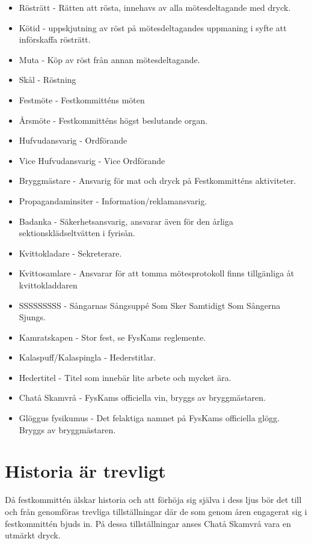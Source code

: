 \documentclass{dgovdoc}
\begin{document}
\begin{itemize}
\item Rösträtt - Rätten att rösta, innehavs av alla mötesdeltagande med dryck.
\item Kötid - uppskjutning av röst på mötesdeltagandes uppmaning i syfte att    införskaffa rösträtt.
\item Muta -  Köp av röst från annan mötesdeltagande.
\item Skål - Röstning
\item Festmöte - Festkommitténs möten
\item Årsmöte - Festkommitténs högst beslutande organ.
\item Hufvudansvarig - Ordförande
\item Vice Hufvudansvarig - Vice Ordförande
\item Bryggmästare - Ansvarig för mat och dryck på Festkommitténs aktiviteter.
\item Propagandaminsiter - Information/reklamansvarig.
\item Badanka - Säkerhetsansvarig, ansvarar även för den årliga sektionsklädseltvätten i fyrisån.
\item Kvittokladare - Sekreterare.
\item Kvittosamlare - Ansvarar för att tomma mötesprotokoll finns tillgänliga åt kvittokladdaren
\item SSSSSSSSS - Sångarnas Sångsuppé Som Sker Samtidigt Som Sångerna Sjungs.
\item Kamratskapen - Stor fest, se FysKams reglemente.
\item Kalaspuff/Kalaspingla - Hederstitlar.
\item Hedertitel - Titel som innebär lite arbete och mycket ära.
\item Chatå Skamvrå - FysKams officiella vin, bryggs av bryggmästaren.
\item Glöggus fysikumus - Det felaktiga namnet på FysKams officiella glögg. Bryggs av bryggmästaren.
\end{itemize}

\section{Historia är trevligt}

Då festkommittén älskar historia och att förhöja sig själva i dess ljus bör det till och från genomföras trevliga tillställningar där de som genom åren engagerat sig i festkommittén bjuds in.
På dessa tillställningar anses Chatå Skamvrå vara en utmärkt dryck.
\end{document}
